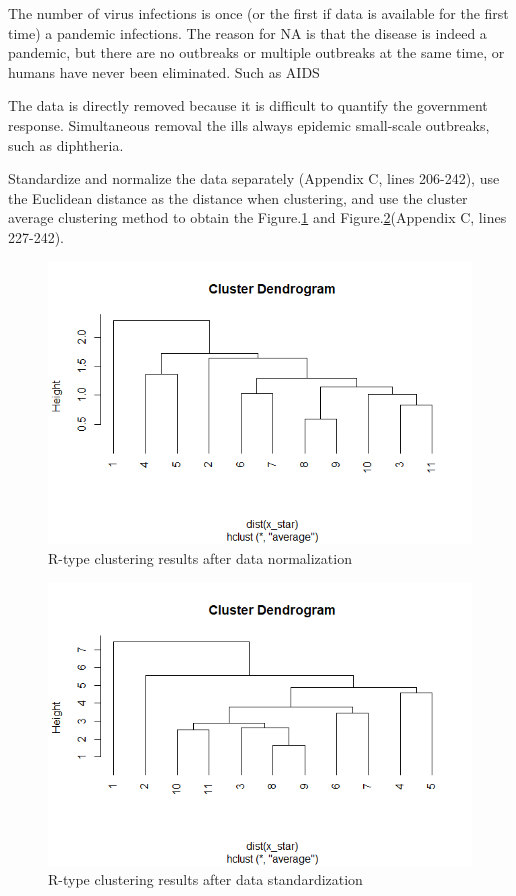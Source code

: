 \documentclass[a4paper, 11pt,twoside=true]{scrartcl}
\begin{document}
\quad The number of virus infections is once (or the first if data is available for the first time) a pandemic infections. The reason for NA is that the disease is indeed a pandemic, but there are no outbreaks or multiple outbreaks at the same time, or humans have never been eliminated. Such as AIDS

\quad The data is directly removed because it is difficult to quantify the government response. Simultaneous removal the ills always epidemic small-scale outbreaks, such as diphtheria.

\quad Standardize and normalize the data separately (Appendix C, lines 206-242), use the Euclidean distance as the distance when clustering, and use the cluster average clustering method to obtain the Figure.\ref{P3F3} and Figure.\ref{P3F4}(Appendix C, lines 227-242).\\
\begin{figure}[H]
	\small
	\centering
	\includegraphics[width=12cm]{P3F4}
	\caption{R-type clustering results after data normalization} \label{P3F3}
\end{figure}
\begin{figure}[h]
	\small
	\centering
	\includegraphics[width=12cm]{P3F3}
	\caption{R-type clustering results after data standardization} \label{P3F4}
\end{figure}
\end{document}
